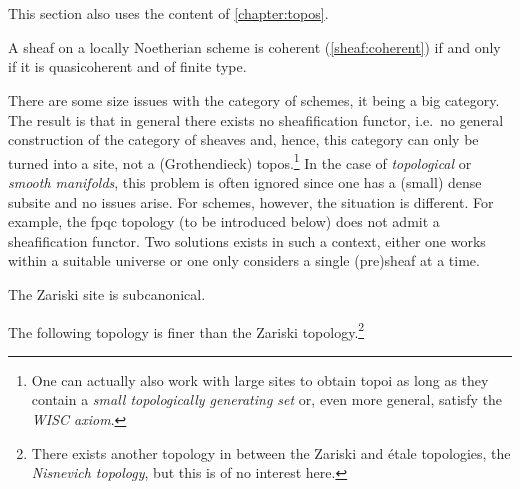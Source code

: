 \section{}

    This section also uses the content of \cref{chapter:topos}.

    \begin{property}
        A sheaf on a locally Noetherian scheme is coherent (\cref{sheaf:coherent}) if and only if it is quasicoherent and of finite type.
    \end{property}

    \begin{remark}
        There are some size issues with the category of schemes, it being a big category. The result is that in general there exists no sheafification functor, i.e.~no general construction of the category of sheaves and, hence, this category can only be turned into a site, not a (Grothendieck) topos.\footnote{One can actually also work with large sites to obtain topoi as long as they contain a \textit{small topologically generating set} or, even more general, satisfy the \textit{WISC axiom}.} In the case of \textit{topological} or \textit{smooth manifolds}, this problem is often ignored since one has a (small) dense subsite and no issues arise. For schemes, however, the situation is different. For example, the fpqc topology (to be introduced below) does not admit a sheafification functor. Two solutions exists in such a context, either one works within a suitable universe or one only considers a single (pre)sheaf at a time.
    \end{remark}

    \begin{property}
        The Zariski site is subcanonical.
    \end{property}

    The following topology is finer than the Zariski topology.\footnote{There exists another topology in between the Zariski and \'etale topologies, the \textit{Nisnevich topology}, but this is of no interest here.}

